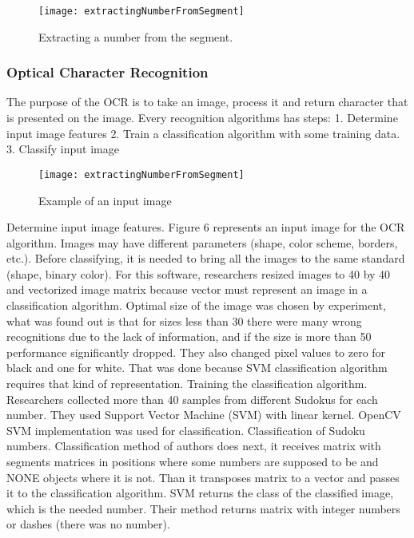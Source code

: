 \documentclass[../../main]{subfiles}
\begin{document}
\begin{figure} [ht]
\begin{center}
\texttt{[image: extractingNumberFromSegment]}
\caption{Extracting a number from the segment.}
\label{fig:extractingNumberFromSegment.}
\end{center}
\end{figure}

\subsubsection{Optical Character Recognition}

The purpose of the OCR is to take an image, process it and return character that is presented on the image.
Every recognition algorithms has steps:
1.	Determine input image features
2.	Train a classification algorithm with some training data.
3.	Classify input image

\begin{figure} [ht]
\begin{center}
\texttt{[image: extractingNumberFromSegment]}
\caption{Example of an input image}
\label{fig:exampleOfInputImage}
\end{center}
\end{figure}

Determine input image features.
Figure 6 represents an input image for the OCR algorithm. Images may have different parameters (shape, color scheme, borders, etc.). Before classifying, it is needed to bring all the images to the same standard (shape, binary color). For this software, researchers resized images to 40 by 40 and vectorized image matrix because vector must represent an image in a classification algorithm. Optimal size of the image was chosen by experiment, what was found out is that for sizes less than 30 there were many wrong recognitions due to the lack of information, and if the size is more than 50 performance significantly dropped. They also changed pixel values to zero for black and one for white. That was done because SVM classification algorithm requires that kind of representation.
Training the classification algorithm. Researchers collected more than 40 samples from different Sudokus for each number. They used Support Vector Machine (SVM) with linear kernel. OpenCV SVM implementation was used for classification.
Classification of Sudoku numbers. Classification method of authors does next, it receives matrix with segments matrices in positions where some numbers are supposed to be and NONE objects where it is not. Than it transposes matrix to a vector and passes it to the classification algorithm. SVM returns the class of the classified image, which is the needed number. Their method returns matrix with integer numbers or dashes (there was no number).
\end{document}
